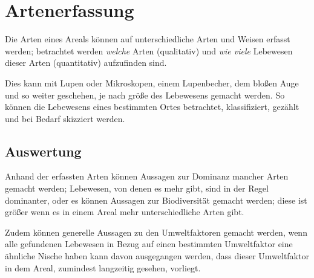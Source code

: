 \documentclass{article}
\begin{document}
\section{Artenerfassung} 
Die Arten eines Areals können auf unterschiedliche Arten und Weisen erfasst werden; betrachtet werden \emph{welche} Arten (qualitativ) und \emph{wie viele} Lebewesen dieser Arten (quantitativ) aufzufinden sind.

Dies kann mit Lupen oder Mikroskopen, einem Lupenbecher, dem bloßen Auge und so weiter geschehen, je nach größe des Lebewesens gemacht werden. So können die Lebewesens eines bestimmten Ortes betrachtet, klassifiziert, gezählt und bei Bedarf skizziert werden.

\subsection{Auswertung}
Anhand der erfassten Arten können Aussagen zur Dominanz mancher Arten gemacht werden; Lebewesen, von denen es mehr gibt, sind in der Regel dominanter, oder es können Aussagen zur Biodiversität gemacht werden; diese ist größer wenn es in einem Areal mehr unterschiedliche Arten gibt.

Zudem können generelle Aussagen zu den Umweltfaktoren gemacht werden, wenn alle gefundenen Lebewesen in Bezug auf einen bestimmten Umweltfaktor eine ähnliche Nische haben kann davon ausgegangen werden, dass dieser Umweltfaktor in dem Areal, zumindest langzeitig gesehen, vorliegt.
\end{document}
